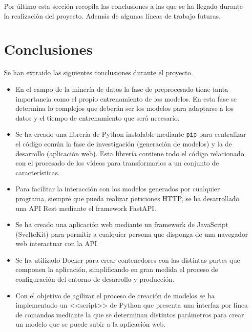 \label{cha:Conclusiones y Líneas de trabajo futuras}

Por último esta sección recopila las conclusiones a las que se ha llegado
durante la realización del proyecto. Además de algunas líneas de trabajo
futuras.

\section{Conclusiones}

Se han extraido las siguientes conclusiones durante el proyecto.

\begin{itemize}
    \item En el campo de la minería de datos la fase de preprocesado tiene tanta
    importancia como el propio entrenamiento de los modelos. En esta fase se
    determina lo complejos que deberán ser los modelos para adaptarse a los
    datos y el tiempo de entrenamiento que será necesario.
    \item Se ha creado una librería de Python instalable mediante \texttt{pip}
    para centralizar el código común la fase de investigación (generación de
    modelos) y la de desarrollo (aplicación web). Esta librería contiene todo el
    código relacionado con el procesado de los vídeos para transformarlos a un
    conjunto de características.
    \item Para facilitar la interacción con los modelos generados por cualquier
    programa, siempre que pueda realizar peticiones HTTP, se ha desarrollado una
    API Rest mediante el framework FastAPI.
    \item Se ha creado una aplicación web mediante un framework de JavaScript
    (SvelteKit) para permitir a cualquier persona que disponga de una navegador
    web interactuar con la API.
    \item Se ha utilizado Docker para crear contenedores con las distintas
    partes que componen la aplicación, simplificando en gran medida el proceso
    de configuración del entorno de desarrollo y producción.
    \item Con el objetivo de agilizar el proceso de creación de modelos se ha
    implementado un <<script>> de Python que presenta una interfaz por línea de
    comandos mediante la que se determinan distintos parámetros para crear un
    modelo que se puede subir a la aplicación web.
\end{itemize}

